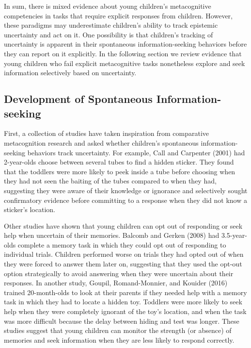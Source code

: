 \documentclass[english,man]{apa6}
\theoremstyle{definition}
\theoremstyle{definition}
\theoremstyle{definition}
\theoremstyle{remark}
\begin{document}
In sum, there is mixed evidence about young children's metacognitive
competencies in tasks that require explicit responses from children.
However, these paradigms may underestimate children's ability to track
epistemic uncertainty and act on it. One possibility is that children's
tracking of uncertainty is apparent in their spontaneous
information-seeking behaviors before they can report on it explicitly.
In the following section we review evidence that young children who fail
explicit metacognitive tasks nonetheless explore and seek information
selectively based on uncertainty.

\subsection{Development of Spontaneous
Information-seeking}\label{development-of-spontaneous-information-seeking}

First, a collection of studies have taken inspiration from comparative
metacognition research and asked whether children's spontaneous
information-seeking behaviors track uncertainty. For example, Call and
Carpenter (2001) had 2-year-olds choose between several tubes to find a
hidden sticker. They found that the toddlers were more likely to peek
inside a tube before choosing when they had not seen the baiting of the
tubes compared to when they had, suggesting they were aware of their
knowledge or ignorance and selectively sought confirmatory evidence
before committing to a response when they did not know a sticker's
location.

Other studies have shown that young children can opt out of responding
or seek help when uncertain of their memories. Balcomb and Gerken (2008)
had 3.5-year-olds complete a memory task in which they could opt out of
responding to individual trials. Children performed worse on trials they
had opted out of when they were forced to answer them later on,
suggesting that they used the opt-out option strategically to avoid
answering when they were uncertain about their responses. In another
study, Goupil, Romand-Monnier, and Kouider (2016) trained 20-month-olds
to look at their parents if they needed help with a memory task in which
they had to locate a hidden toy. Toddlers were more likely to seek help
when they were completely ignorant of the toy's location, and when the
task was more difficult because the delay between hiding and test was
longer. These studies suggest that young children can monitor the
strength (or absence) of memories and seek information when they are
less likely to respond correctly.
\end{document}
